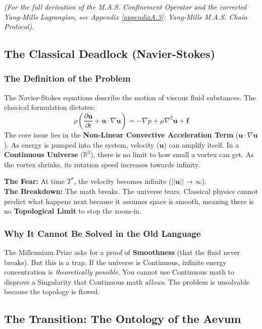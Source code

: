 \documentclass[11pt, letterpaper]{article}
\begin{document}
\noindent \textit{(For the full derivation of the M.A.S. Confinement Operator and the corrected Yang-Mills Lagrangian, see Appendix \ref{appendixA.3}: Yang-Mills M.A.S. Chain Protocol).}

\subsection{The Classical Deadlock (Navier-Stokes)}\label{sec:3}

\subsubsection{The Definition of the Problem}\label{sec:3.1}
The Navier-Stokes equations describe the motion of viscous fluid substances. The classical formulation dictates:
\begin{equation}
    \rho \left( \frac{\partial \mathbf{u}}{\partial t} + \mathbf{u} \cdot \nabla \mathbf{u} \right) = -\nabla p + \mu \nabla^2 \mathbf{u} + \mathbf{f}
\end{equation}
The core issue lies in the \textbf{Non-Linear Convective Acceleration Term} ($\mathbf{u} \cdot \nabla \mathbf{u}$). As energy is pumped into the system, velocity ($\mathbf{u}$) can amplify itself. In a \textbf{Continuous Universe} ($\mathbb{R}^3$), there is no limit to how small a vortex can get. As the vortex shrinks, its rotation speed increases towards infinity.

\noindent \textbf{The Fear:} At time $T^*$, the velocity becomes infinite ($||\mathbf{u}|| \to \infty$). \\
\textbf{The Breakdown:} The math breaks. The universe tears. Classical physics cannot predict what happens next because it assumes space is smooth, meaning there is no \textbf{Topological Limit} to stop the zoom-in.

\subsubsection{Why It Cannot Be Solved in the Old Language}
The Millennium Prize asks for a proof of \textbf{Smoothness} (that the fluid never breaks). But this is a trap. If the universe is Continuous, infinite energy concentration is \textit{theoretically possible}. You cannot use Continuous math to disprove a Singularity that Continuous math \textit{allows}. The problem is unsolvable because the topology is flawed.

\subsection{The Transition: The Ontology of the Aevum}\label{sec:3.2}
\end{document}
